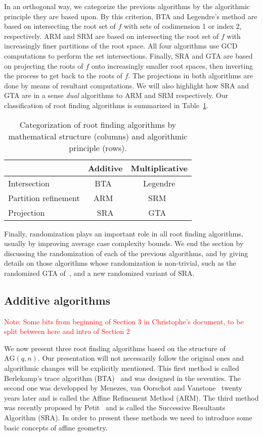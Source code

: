 \documentclass{article}
\newcommand{\qq}{q}
\newcommand{\nn}{n}
\newcommand{\AG}{\mathrm{AG}(\qq,\nn)}
\newcounter{algo}
\newcommand{\Notes}[1]{\textcolor{red}{Note: #1}}
\begin{document}
In an orthogonal way, we categorize the previous algorithms by the
algorithmic principle they are based upon. By this criterion, BTA and
Legendre's method are based on intersecting the root set of $f$ with
sets of codimension 1 or index 2, respectively. ARM and SRM are based
on intersecting the root set of $f$ with increasingly finer partitions
of the root space. All four algorithms use GCD computations to perform
the set intersections. Finally, SRA and GTA are based on projecting
the roots of $f$ onto increasingly smaller root spaces, then inverting
the process to get back to the roots of $f$. The projections in both
algorithms are done by means of resultant computations. We will also
highlight how SRA and GTA are in a sense \emph{dual} algorithms to ARM
and SRM respectively. Our classification of root finding algorithms is
summarized in Table~\ref{tab:algorithms}.

\begin{table}
  \centering
  \begin{tabular}{l | c c}
    & Additive & Multiplicative\\
    \hline
    Intersection & BTA~\cite{berl70} & Legendre\\
    Partition refinement & ARM~\cite{Menvanovans92} & SRM~\cite{Moenck77}\\
    Projection & SRA\cite{cgUCL-P14} & GTA~\cite{grenet2015deterministic}
  \end{tabular}
  \caption{Categorization of root finding algorithms by mathematical structure (columns) and algorithmic principle (rows).}
  \label{tab:algorithms}
\end{table}

Finally, randomization plays an important role in all root finding
algorithms, usually by improving average case complexity bounds.  We end
the section by discussing the randomization of each of the previous
algorithms, and by giving details on those algorithms whose
randomization is non-trivial, such as the randomized GTA
of~\cite{grenet-hoeven-lecerf-roots}, and a new randomized variant of
SRA.


\subsection{Additive algorithms}
\label{sec:affine-geom-algor}
\Notes{Some bits from beginning of Section 3 in Christophe's document, to be split between here and  intro of Section 2}

\medskip 

We now present three root finding algorithms based on the structure of $\AG$. Our presentation will not necessarily follow the original ones and algorithmic changes will be explicitly mentioned. 
This first method is called Berlekamp's trace algorithm (BTA)~\cite{berl70} and was designed in the seventies. The second one was developped by Menezes, van Oorschot and Vanstone~\cite{Menvanovans92}
 twenty years later and is called the Affine Refinement Method (ARM). The third method was recently 
 proposed by Petit~\cite{cgUCL-P14} and is called the Successive Resultants Algorithm (SRA). In order to present these methods we need to introduce some basic concepts of affine geometry.
\end{document}
